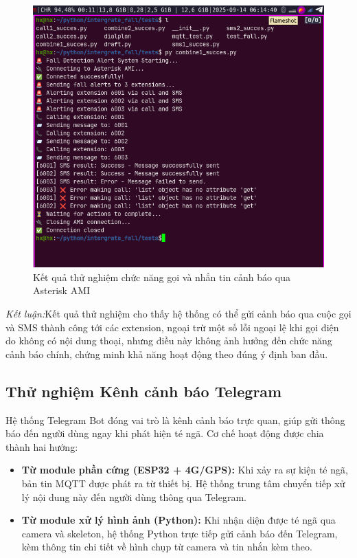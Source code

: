 \begin{figure}[H]
    \centering
    \includegraphics[width=0.95\linewidth]{figures/ast_call_sms_test.png}
    \caption{Kết quả thử nghiệm chức năng gọi và nhắn tin cảnh báo qua Asterisk AMI}
    \label{fig:ast_call_sms_test}
\end{figure}

\textit{Kết luận:}Kết quả thử nghiệm cho thấy hệ thống có thể gửi cảnh báo qua cuộc gọi và SMS thành công tới các extension, ngoại trừ một số lỗi ngoại lệ khi gọi điện do không có nội dung thoại, nhưng điều này không ảnh hưởng đến chức năng cảnh báo chính, chứng minh khả năng hoạt động theo đúng ý định ban đầu.

\subsection{Thử nghiệm Kênh cảnh báo Telegram}
\label{sec:telegram_alert}

Hệ thống Telegram Bot đóng vai trò là kênh cảnh báo trực quan, giúp gửi thông báo đến người dùng ngay khi phát hiện té ngã.  
Cơ chế hoạt động được chia thành hai hướng:
\begin{itemize}
    \item \textbf{Từ module phần cứng (ESP32 + 4G/GPS):} Khi xảy ra sự kiện té ngã, bản tin MQTT được phát ra từ thiết bị. Hệ thống trung tâm chuyển tiếp xử lý nội dung này đến người dùng thông qua Telegram.
    \item \textbf{Từ module xử lý hình ảnh (Python):} Khi nhận diện được té ngã qua camera và skeleton, hệ thống Python trực tiếp gửi cảnh báo đến Telegram, kèm thông tin chi tiết về hình chụp từ camera và tin nhắn kèm theo.
\end{itemize}

